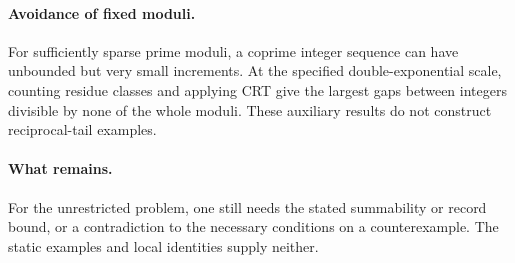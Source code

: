 \paragraph{Avoidance of fixed moduli.}
For sufficiently sparse prime moduli, a coprime integer sequence can
have unbounded but very small increments. At the specified
double-exponential scale, counting residue classes and applying CRT give
the largest gaps between integers divisible by none of the whole moduli.
These auxiliary results do not construct reciprocal-tail examples.

\paragraph{What remains.}
For the unrestricted problem, one still needs the stated summability or
record bound, or a contradiction to the necessary conditions on a
counterexample. The static examples and local identities supply neither.

